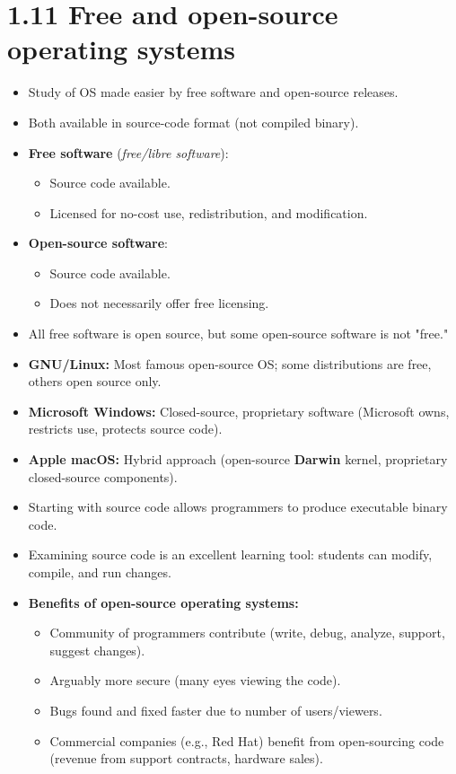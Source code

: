 \documentclass{article}
\begin{document}
\section*{1.11 Free and open-source operating systems}
\begin{itemize}
    \item Study of OS made easier by free software and open-source releases.
    \item Both available in source-code format (not compiled binary).
    \item \textbf{Free software} (\textit{free/libre software}):
    \begin{itemize}
        \item Source code available.
        \item Licensed for no-cost use, redistribution, and modification.
    \end{itemize}
    \item \textbf{Open-source software}:
    \begin{itemize}
        \item Source code available.
        \item Does not necessarily offer free licensing.
    \end{itemize}
    \item All free software is open source, but some open-source software is not "free."
    \item \textbf{GNU/Linux:} Most famous open-source OS; some distributions are free, others open source only.
    \item \textbf{Microsoft Windows:} Closed-source, proprietary software (Microsoft owns, restricts use, protects source code).
    \item \textbf{Apple macOS:} Hybrid approach (open-source \textbf{Darwin} kernel, proprietary closed-source components).
    \item Starting with source code allows programmers to produce executable binary code.
    \item Examining source code is an excellent learning tool: students can modify, compile, and run changes.
    \item \textbf{Benefits of open-source operating systems:}
    \begin{itemize}
        \item Community of programmers contribute (write, debug, analyze, support, suggest changes).
        \item Arguably more secure (many eyes viewing the code).
        \item Bugs found and fixed faster due to number of users/viewers.
        \item Commercial companies (e.g., Red Hat) benefit from open-sourcing code (revenue from support contracts, hardware sales).
    \end{itemize}
\end{itemize}
\end{document}

